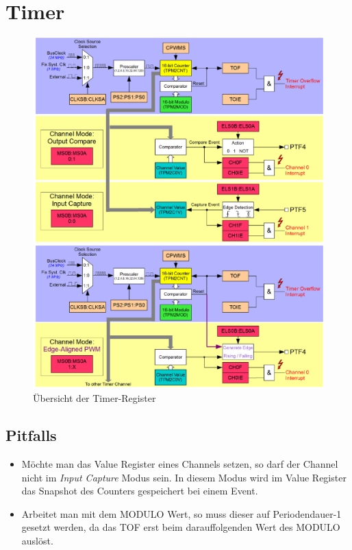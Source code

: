 \newpage
\section{Timer}

\begin{figure}[h!]
	\centering
	\includegraphics[width=1\textwidth]{../fig/timer.pdf}

	\includegraphics[width=1\textwidth]{../fig/pwm.pdf}
	\caption{Übersicht der Timer-Register}
\end{figure}

\newpage
\subsection{Pitfalls}
\begin{itemize}
	\item Möchte man das Value Register eines Channels setzen, so darf
		der Channel nicht im \emph{Input Capture} Modus sein. In
		diesem Modus wird im Value Register das Snapshot des Counters
		gespeichert bei einem Event.
	\item Arbeitet man mit dem MODULO Wert, so muss dieser auf
		Periodendauer-1 gesetzt werden, da das TOF erst beim
		darauffolgenden Wert des MODULO auslöst.
\end{itemize}

